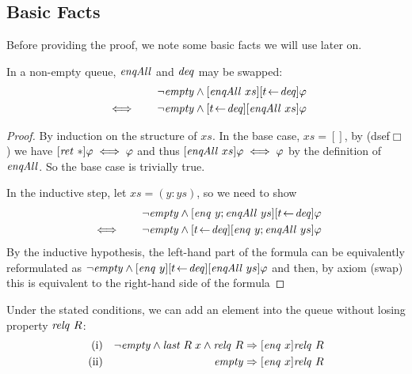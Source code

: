 \subsection{Basic Facts}
Before providing the proof, we note some basic facts we will use later on.
\begin{lem}
In a non-empty queue, $\mathit{enqAll}$ and $\mathit{deq}$ may be swapped:
\label{enqAll-deq}
\begin{eqnarray*}
&& \lnot \mathit{empty} \land [\mathit{enqAll}~xs][t\!\gets\!\mathit{deq}]\varphi \\
&\iff \quad& \lnot \mathit{empty} \land [t\!\gets\!\mathit{deq}][\mathit{enqAll}~xs]\varphi
\end{eqnarray*}
\end{lem}

\begin{proof}
By induction on the structure of $xs$. In the base case, $xs = []$, by
(dsef$\Box$) we have $[\mathit{ret}~\ast]\varphi \iff \varphi$ and thus $[\mathit{enqAll}~xs]\varphi \iff \varphi$
by the definition of $\mathit{enqAll}$. So the base case is trivially true.

In the inductive step, let $xs = (y: ys)$, so we need to show
\begin{eqnarray*}
&& \lnot \mathit{empty} \land [\mathit{enq}~y; \mathit{enqAll}~ys][t\!\gets\!\mathit{deq}]\varphi \\
&\iff \quad& \lnot \mathit{empty} \land [t\!\gets\!\mathit{deq}][\mathit{enq}~y; \mathit{enqAll}~ys]\varphi
\end{eqnarray*}
By the inductive hypothesis, the left-hand part of the formula can be
equivalently 
reformulated as $\lnot \mathit{empty}\land [\mathit{enq}~y][t\!\gets\!\mathit{deq}][\mathit{enqAll}~ys]\varphi$ and then, by axiom
(swap) this is equivalent to the right-hand side of the formula
\end{proof}


\begin{lem}
\label{thm:enq-relq}
Under the stated conditions, we can add an element into the queue without
losing property $\mathit{relq}~R$:
\begin{eqnarray*}
\text{(i)} && \lnot \mathit{empty} \land \mathit{last}\; R\;x \land \mathit{relq}\  R \Rightarrow [\mathit{enq}~x]\mathit{relq}\  R \\
\text{(ii)} && \mathit{empty} \Rightarrow [\mathit{enq}~x]\mathit{relq}\  R
\end{eqnarray*}
\end{lem}

